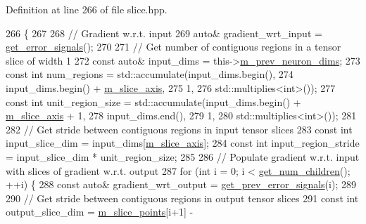 Definition at line 266 of file slice.\+hpp.


\begin{DoxyCode}
266                         \{
267 
268     \textcolor{comment}{// Gradient w.r.t. input}
269     \textcolor{keyword}{auto}& gradient\_wrt\_input = \hyperlink{classlbann_1_1Layer_adb561e140e0bb601f3c5a8ee053a71d2}{get\_error\_signals}();
270 
271     \textcolor{comment}{// Get number of contiguous regions in a tensor slice of width 1}
272     \textcolor{keyword}{const} \textcolor{keyword}{auto}& input\_dims = this->\hyperlink{classlbann_1_1Layer_ae204d1a2a79606eaa117273857ff62a3}{m\_prev\_neuron\_dims};
273     \textcolor{keyword}{const} \textcolor{keywordtype}{int} num\_regions = std::accumulate(input\_dims.begin(),
274                                             input\_dims.begin() + \hyperlink{classlbann_1_1slice__layer_a349dcd71f67d77d40247da24e4641ea2}{m\_slice\_axis},
275                                             1,
276                                             std::multiplies<int>());
277     \textcolor{keyword}{const} \textcolor{keywordtype}{int} unit\_region\_size = std::accumulate(input\_dims.begin() + 
      \hyperlink{classlbann_1_1slice__layer_a349dcd71f67d77d40247da24e4641ea2}{m\_slice\_axis} + 1,
278                                                  input\_dims.end(),
279                                                  1,
280                                                  std::multiplies<int>());
281 
282     \textcolor{comment}{// Get stride between contiguous regions in input tensor slices}
283     \textcolor{keyword}{const} \textcolor{keywordtype}{int} input\_slice\_dim = input\_dims[\hyperlink{classlbann_1_1slice__layer_a349dcd71f67d77d40247da24e4641ea2}{m\_slice\_axis}];
284     \textcolor{keyword}{const} \textcolor{keywordtype}{int} input\_region\_stride = input\_slice\_dim * unit\_region\_size;
285     
286     \textcolor{comment}{// Populate gradient w.r.t. input with slices of gradient w.r.t. output}
287     \textcolor{keywordflow}{for} (\textcolor{keywordtype}{int} i = 0; i < \hyperlink{classlbann_1_1Layer_a1409a117c31a7ea4f2c7a4d22a3e86c3}{get\_num\_children}(); ++i) \{
288       \textcolor{keyword}{const} \textcolor{keyword}{auto}& gradient\_wrt\_output = \hyperlink{classlbann_1_1Layer_a7ac4579d3c1671dfaf86e3b618d6938a}{get\_prev\_error\_signals}(i);
289 
290       \textcolor{comment}{// Get stride between contiguous regions in output tensor slices}
291       \textcolor{keyword}{const} \textcolor{keywordtype}{int} output\_slice\_dim = \hyperlink{classlbann_1_1slice__layer_af79dab13a70da2e81209e7ae15166e30}{m\_slice\_points}[i+1] - 

\end{DoxyCode}
